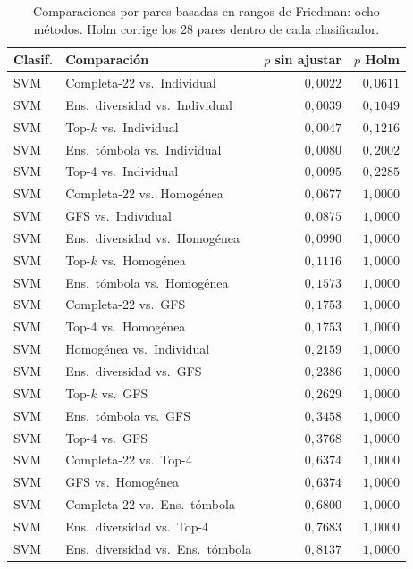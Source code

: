 \documentclass[11pt,a4paper]{article}
\begin{document}
\begin{table}[H]
\centering\fontsize{8}{10}\selectfont\setlength{\tabcolsep}{3.0pt}
\caption{Comparaciones por pares basadas en rangos de Friedman: ocho métodos. Holm corrige los 28 pares dentro de cada clasificador.}
\label{tab:sel-metodos-holm}
\begin{tabular}{@{}llrr@{}}
\toprule
Clasif. & Comparación & $p$ sin ajustar & $p$ Holm \\
\midrule
SVM & Completa-22 vs.\ Individual & $0{,}0022$ & $0{,}0611$ \\
SVM & Ens.\ diversidad vs.\ Individual & $0{,}0039$ & $0{,}1049$ \\
SVM & Top-$k$ vs.\ Individual & $0{,}0047$ & $0{,}1216$ \\
SVM & Ens.\ tómbola vs.\ Individual & $0{,}0080$ & $0{,}2002$ \\
SVM & Top-4 vs.\ Individual & $0{,}0095$ & $0{,}2285$ \\
SVM & Completa-22 vs.\ Homogénea & $0{,}0677$ & $1{,}0000$ \\
SVM & GFS vs.\ Individual & $0{,}0875$ & $1{,}0000$ \\
SVM & Ens.\ diversidad vs.\ Homogénea & $0{,}0990$ & $1{,}0000$ \\
SVM & Top-$k$ vs.\ Homogénea & $0{,}1116$ & $1{,}0000$ \\
SVM & Ens.\ tómbola vs.\ Homogénea & $0{,}1573$ & $1{,}0000$ \\
SVM & Completa-22 vs.\ GFS & $0{,}1753$ & $1{,}0000$ \\
SVM & Top-4 vs.\ Homogénea & $0{,}1753$ & $1{,}0000$ \\
SVM & Homogénea vs.\ Individual & $0{,}2159$ & $1{,}0000$ \\
SVM & Ens.\ diversidad vs.\ GFS & $0{,}2386$ & $1{,}0000$ \\
SVM & Top-$k$ vs.\ GFS & $0{,}2629$ & $1{,}0000$ \\
SVM & Ens.\ tómbola vs.\ GFS & $0{,}3458$ & $1{,}0000$ \\
SVM & Top-4 vs.\ GFS & $0{,}3768$ & $1{,}0000$ \\
SVM & Completa-22 vs.\ Top-4 & $0{,}6374$ & $1{,}0000$ \\
SVM & GFS vs.\ Homogénea & $0{,}6374$ & $1{,}0000$ \\
SVM & Completa-22 vs.\ Ens.\ tómbola & $0{,}6800$ & $1{,}0000$ \\
SVM & Ens.\ diversidad vs.\ Top-4 & $0{,}7683$ & $1{,}0000$ \\
SVM & Ens.\ diversidad vs.\ Ens.\ tómbola & $0{,}8137$ & $1{,}0000$ \\

\end{tabular}
\end{table}
\end{document}
